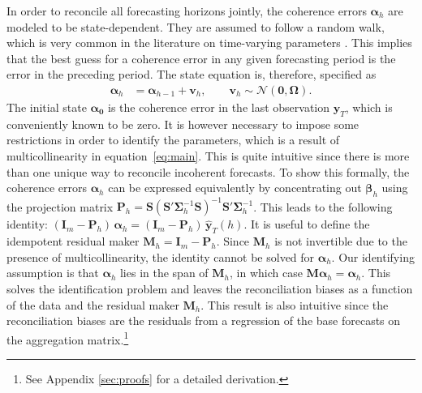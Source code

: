\documentclass[a4paper,fleqn,11pt]{article}
\begin{document}
In order to reconcile all forecasting horizons jointly, the coherence errors $\boldsymbol{\alpha}_h$ are modeled to be state-dependent. They are assumed to follow a random walk, which is very common in the literature on time-varying parameters \citep[see, for instance,][and references therein]{Primiceri2005}. This implies that the best guess for a coherence error in any given forecasting period is the error in the preceding period. The state equation is, therefore, specified as
\begin{align}
	\label{eq:state}
	\boldsymbol{\alpha}_h & = \boldsymbol{\alpha}_{h-1} + \textbf{v}_h, \qquad \textbf{v}_h \sim \mathcal{N}(\textbf{0}, \boldsymbol{\Omega}).
\end{align}
The initial state $\boldsymbol{\alpha_0}$ is the coherence error in the last observation $\textbf{y}_{T}$, which is conveniently known to be zero. It is however necessary to impose some restrictions in order to identify the parameters, which is a result of multicollinearity in equation~\eqref{eq:main}. This is quite intuitive since there is more than one unique way to reconcile incoherent forecasts. To show this formally, the coherence errors $\boldsymbol{\alpha}_h$ can be expressed equivalently by concentrating out $\boldsymbol{\beta}_h$ using the projection matrix $\textbf{P}_h = \textbf{S}(\textbf{S}'\boldsymbol{\Sigma}_h^{-1} \textbf{S})^{-1}\textbf{S}'\boldsymbol{\Sigma}_h^{-1}$. This leads to the following identity: $(\textbf{I}_m - \textbf{P}_h)\, \boldsymbol{\alpha}_h = (\textbf{I}_m - \textbf{P}_h)\, \mathbf{\hat{y}}_{T}(h).$ It is useful to define the idempotent residual maker $\textbf{M}_h = \textbf{I}_m - \textbf{P}_h$. Since $\textbf{M}_h$ is not invertible due to the presence of multicollinearity, the identity cannot be solved for $\boldsymbol{\alpha}_h$. Our identifying assumption is that $\boldsymbol{\alpha}_h$ lies in the span of $\textbf{M}_h$, in which case $\textbf{M}\boldsymbol{\alpha}_h = \boldsymbol{\alpha}_h$. This solves the identification problem and leaves the reconciliation biases as a function of the data and the residual maker $\textbf{M}_h$. This result is also intuitive since the reconciliation biases are the residuals from a regression of the base forecasts on the aggregation matrix.\footnote{See Appendix \ref{sec:proofs} for a detailed derivation.}
\end{document}
